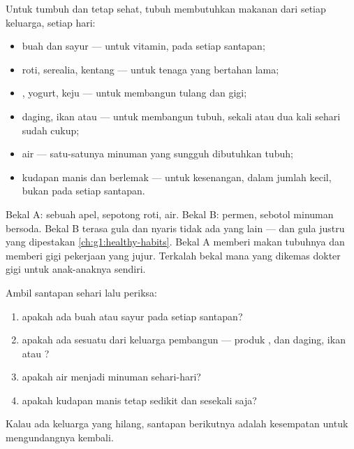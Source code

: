 \begin{proposition}\label{prop:g2:teeth-and-eating-well:balanced}
Untuk tumbuh dan tetap sehat, tubuh membutuhkan makanan dari setiap
keluarga, setiap hari:
\begin{itemize}
  \item buah dan sayur --- untuk vitamin, pada setiap santapan;
  \item roti, serealia, kentang --- untuk tenaga yang bertahan lama;
  \item {}, yogurt, keju --- untuk membangun tulang dan gigi;
  \item daging, ikan atau  --- untuk membangun tubuh, sekali atau
        dua kali sehari sudah cukup;
  \item air --- satu-satunya minuman yang sungguh dibutuhkan tubuh;
  \item kudapan manis dan berlemak --- untuk kesenangan, dalam jumlah
        kecil, bukan pada setiap santapan.
\end{itemize}
\end{proposition}
\admitted

\begin{example}\label{ex:g2:teeth-and-eating-well:snack}
Bekal A: sebuah apel, sepotong roti, air. Bekal B: permen, sebotol
minuman bersoda. Bekal B terasa gula dan nyaris tidak ada yang lain
--- dan gula justru yang dipestakan 
\cref{ch:g1:healthy-habits}. Bekal A memberi makan tubuhnya dan
memberi gigi pekerjaan yang jujur. Terkalah bekal mana yang dikemas
dokter gigi untuk anak-anaknya sendiri.
\end{example}

\begin{method}\label{met:g2:teeth-and-eating-well:check}
Ambil santapan sehari lalu periksa:
\begin{enumerate}
  \item apakah ada buah atau sayur pada setiap santapan?
  \item apakah ada sesuatu dari keluarga pembangun --- produk ,
        dan daging, ikan atau ?
  \item apakah air menjadi minuman sehari-hari?
  \item apakah kudapan manis tetap sedikit dan sesekali saja?
\end{enumerate}
Kalau ada keluarga yang hilang, santapan berikutnya adalah kesempatan
untuk mengundangnya kembali.
\end{method}

